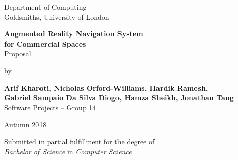 \documentclass[12pt]{report}
\newcommand\blankpage{%
    \null
    \thispagestyle{empty}%
    \addtocounter{page}{-1}%
    \newpage}
\begin{document}
\begin{titlepage}
    \begin{center}
        \vspace*{1cm}
        Department of Computing\\
        Goldsmiths, University of London\\

        \vspace*{3.25cm}

        \textbf{\LARGE Augmented Reality Navigation System\\}
        \vspace*{0.20cm}           
        \textbf{\LARGE for Commercial Spaces}\\
        \vspace*{0.55cm}           
        {\large Proposal}\\
        \vspace*{0.15cm}           

        \vspace*{2cm}
        by\\
        \vspace*{0.25cm}   

        \textbf{Arif Kharoti, Nicholas Orford-Williams, Hardik Ramesh,\\}
        \textbf{Gabriel Sampaio Da Silva Diogo, Hamza Sheikh, Jonathan Tang\\}
        \vspace*{0.1cm}    
        Software Projects – Group 14\\  

        \vspace{2cm}

        Autumn 2018
        \vfill

        Submitted in partial fulfillment for the degree of\\
        \textit{Bachelor of Science} in \textit{Computer Science}

        \vspace{1.5cm}

    \end{center}
\end{titlepage}

\afterpage{\blankpage}

\thispagestyle{plain}

\end{document}
